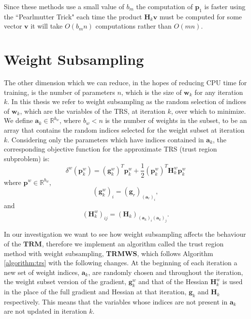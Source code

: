 \documentclass[letterpaper,12pt,titlepage,oneside,final]{book}
\begin{document}
	Since these methods use a small value of $b_{m}$ the computation of $\mathbf{p}_{1}$ is faster using the ``Pearlmutter Trick" each time the product $\mathbf{H}_{k}\mathbf{v}$ must be computed for some vector $\mathbf{v}$ it will take $O(b_{m}n)$ computations rather than $O(mn)$.
	
	\section{Weight Subsampling}

	The other dimension which we can reduce, in the hopes of reducing CPU time for training, is the number of parameters $n$, which is the size of $\mathbf{w}_{k}$ for any iteration $k$. In this thesis we refer to weight subsampling as the random selection of indices of $\mathbf{w}_{k}$, which are the variables of the TRS, at iteration $k$, over which to minimize. We define $\mathbf{a}_{k} \in \mathbb{R}^{b_{w}}$, where $b_{w} < n$ is the number of weights in the subset, to be an array that contains the random indices selected for the weight subset at iteration $k$. Considering only the parameters which have indices contained in $\mathbf{a}_{k}$, the corresponding objective function for the approximate TRS (trust region subproblem) is:
	\begin{equation}
	\delta^{w}(\mathbf{p}_{k}^{w}) = (\mathbf{g}_{k}^{w})^{T}\mathbf{p}_{k}^{w} + \frac{1}{2}(\mathbf{p}_{k}^{w})^{T}\mathbf{H}_{k}^{w}\mathbf{p}_{k}^{w}
	\label{equation:w_subset}
	\end{equation}
	where $\mathbf{p}^{w} \in \mathbb{R}^{b_{w}}$, 
	\begin{equation}
	(\mathbf{g}^{w}_{k})_{i} = (\mathbf{g}_{r})_{(\mathbf{a}_{r})_{i}},
	\end{equation}
	and
	\begin{equation}
	(\mathbf{H}^{w}_{k})_{ij} = (\mathbf{H}_{k})_{(\mathbf{a}_{k})_{i}(\mathbf{a}_{k})_{j}}.
	\end{equation}
	
	In our investigation we want to see how weight subsampling affects the behaviour of the $\mathbf{TRM}$, therefore we implement an algorithm called the trust region method with weight subsampling, \textbf{TRMWS}, which follows Algorithm \ref{algorithm:trs} with the following changes. At the beginning of each iteration a new set of weight indices, $\mathbf{a}_{k}$, are randomly chosen and throughout the iteration, the weight subset version of the gradient, $\mathbf{g}_{k}^{w}$ and that of the Hessian $\mathbf{H}_{k}^{w}$ is used in the place of the full gradient and Hessian at that iteration, $\mathbf{g}_{k}$ and $\mathbf{H}_{k}$ respectively. This means that the variables whose indices are not present in $\mathbf{a}_{k}$ are not updated in iteration $k$.
	
\end{document}
